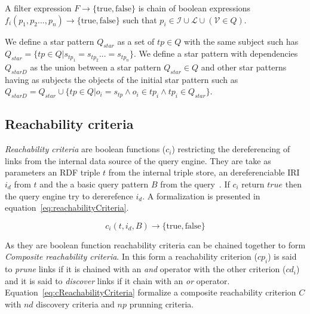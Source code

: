 \begin{definition}\label{def:filterExpression}
    A filter expression $F \rightarrow \{\mathrm{true}, \mathrm{false}\}$ is chain of boolean expressions $f_i(p_1, p_2...,p_n) \rightarrow \{\mathrm{true}, \mathrm{false}\}$ such that 
    $p_i \in \mathcal{I} \cup \mathcal{L} \cup (\mathcal{V}\in Q)$.
\end{definition}

\begin{definition}\label{def:starPattern}
We define a star pattern $Q_{star}$ as a set of $tp \in Q$ with the same subject such has $Q_{star} = \{ tp\in Q| s_{tp_1} = s_{tp_2} ... = s_{tp_n}\}$.
We define a star pattern with dependencies $Q_{starD}$ as the union between a star pattern $Q_{star} \in Q$ and other star patterns having as subjects
the objects of the initial star pattern such as $Q_{starD} = Q_{star} \cup \{tp \in Q| o_{i} = s_{tp} \land o_{i}\in tp_i \land tp_i  \in Q_{star}\}$.
\end{definition}

\subsection{Reachability criteria}

\emph{Reachability criteria} are boolean functions ($c_i$) restricting the dereferencing of links from the internal data source of the query engine.
They are take as parameters an RDF triple $t$ from the internal triple store, an dereferenciable IRI $i_d$ from $t$ and the a basic query pattern $B$ from the query~\cite{Hartig2012}.
If $c_i$ return $true$ then the query engine try to dererefence $i_d$.
A formalization is presented in equation~\ref{eq:reachabilityCriteria}.


\begin{equation}\label{eq:reachabilityCriteria}
c_i(t, i_d, B) \rightarrow \{\mathrm{true}, \mathrm{false}\}
\end{equation}

As they are boolean function reachability criteria can be chained together to form \emph{Composite reachability criteria}.
In this form a reachability criterion ($cp_i$) is said to \emph{prune} links if it is chained with an \emph{and} operator with the other criterion ($cd_i$) and it is said to \emph{discover} links if it chain with an \emph{or} operator.
Equation~\ref{eq:cReachabilityCriteria} formalize a composite reachability criterion $C$ with $nd$ discovery criteria and $np$ prunning criteria.

